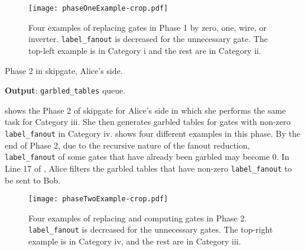 \begin{figure}
    \centering
    \texttt{[image: phaseOneExample-crop.pdf]}
    \caption{Four examples of replacing gates in Phase 1 by zero, one, wire, or inverter.
    \texttt{label\_fanout} is decreased for the unnecessary gate.
    The top-left example is in Category i and the rest are in Category ii.}
    \label{fig:phaseOneExample}
\end{figure}

\begin{algorithm}
\caption{Phase 2 in \gls{skipgate}, Alice's side.}\label{alg:phase2_alice}
\textbf{Output}: \texttt{garbled\_tables} queue.\\
\begin{algorithmic}[1]
		\ENDIF
	\ELSE {}
    \ENDIF
	\ENDIF
\ENDFOR
{}
\end{algorithmic}
\end{algorithm}

 shows the Phase 2 of \gls{skipgate} for Alice's side in which she performs the same task for Category iii.
She then generates garbled tables for gates with non-zero \texttt{label\_fanout} in Category iv.
 shows four different examples in this phase.
By the end of Phase 2, due to the recursive nature of the fanout reduction, \texttt{label\_fanout} of some gates that have already been garbled may become 0.
In Line 17 of , Alice filters the garbled tables that have non-zero \texttt{label\_fanout} to be sent to Bob.

\begin{figure}
    \centering
    \texttt{[image: phaseTwoExample-crop.pdf]}
    \caption{Four examples of replacing and computing gates in Phase 2.
    		 \texttt{label\_fanout} is decreased for the unnecessary gates.
         The top-right example is in Category iv, and the rest are in Category iii.}
    \label{fig:phaseTwoExample}
\end{figure}

